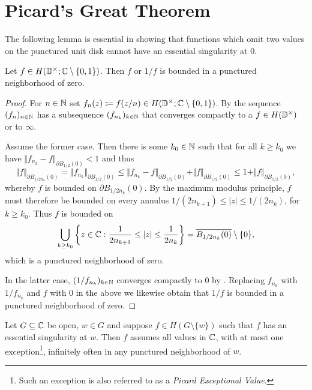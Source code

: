 \section{Picard's Great Theorem}
\label{sec:picards-great-theorem}

The following lemma is essential in showing that functions which omit two values on the punctured unit disk cannot have an essential singularity at $0$.

\begin{lemma} \label{lem:great-picard-bounded}
    Let $f \in H(\mathbb{D}^\times; \mathbb{C} \setminus \{ 0, 1 \})$. Then $f$ or $1/f$ is bounded in a punctured neighborhood of zero.
\end{lemma}

\begin{proof}
    For $n \in \mathbb{N}$ set $f_n(z) \coloneqq f(z / n) \in H(\mathbb{D}^\times; \mathbb{C} \setminus \{ 0, 1 \})$. By  the sequence $(f_n)_{n \in \mathbb{N}}$ has a subsequence $(f_{n_k})_{k \in \mathbb{N}}$ that converges compactly to a $f \in H(\mathbb{D}^\times)$ or to $\infty$.

    Assume the former case. Then there is some $k_0 \in \mathbb{N}$ such that for all $k \geq k_0$ we have $ \Vert f_{n_k} - f \Vert_{\partial B_{1/2}(0)} < 1 $ and thus
    \begin{equation*}
        \Vert f \Vert_{\partial B_{1/2n_k}(0)} = \Vert f_{n_k} \Vert_{\partial B_{1/2}(0)} \leq \Vert f_{n_k} - f \Vert_{\partial B_{1/2}(0)} + \Vert f \Vert_{\partial B_{1/2}(0)} \leq 1 + \Vert f \Vert_{\partial B_{1/2}(0)},
    \end{equation*}
    whereby $f$ is bounded on $\partial B_{1/2n_k}(0)$.
    By the maximum modulus principle, $f$ must therefore be bounded on every annulus $1 / (2 n_{k + 1}) \leq \vert z \vert \leq 1 / (2 n_k)$, for $k \geq k_0$. Thus $f$ is bounded on
    $$ \bigcup_{k \geq k_0} \left\{ z \in \mathbb{C} : \frac{1}{2 n_{k+1}} \leq \vert z \vert \leq \frac{1}{2 n_k} \right\} = \overline{B_{1/2n_k}(0)} \setminus \{ 0 \}, $$
    which is a punctured neighborhood of zero.

    In the latter case, $(1 / f_{n_k})_{k \in \mathbb{N}}$ converges compactly to $0$ by . Replacing $f_{n_k}$ with $1 / f_{n_k}$ and $f$ with $0$ in the above we likewise obtain that $1 / f$ is bounded in a punctured neighborhood of zero.
\end{proof}

\begin{theorem} \label{thm:picards-great-theorem}
    Let $G \subseteq \mathbb{C}$ be open, $w \in G$ and suppose $f \in H(G \setminus \{ w \})$ such that $f$ has an essential singularity at $w$. Then $f$ assumes all values in $\mathbb{C}$, with at most one exception\footnote{Such an exception is also referred to as a \emph{Picard Exceptional Value}.}, infinitely often in any punctured neighborhood of $w$.
\end{theorem}

